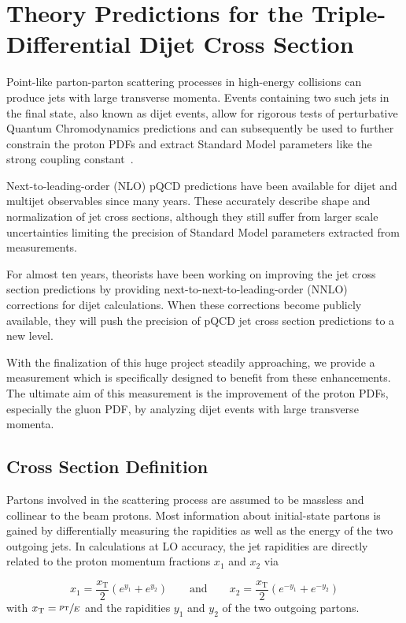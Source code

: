 
\chapter{Theory Predictions for the Triple-Differential Dijet Cross Section}
\label{sec:theory_predictions}

Point-like parton-parton scattering processes in high-energy collisions can
produce jets with large transverse momenta. Events containing two such jets in
the final state, also known as dijet events, allow for rigorous tests of
perturbative Quantum Chromodynamics predictions and can subsequently be used to
further constrain the proton PDFs and extract Standard Model parameters like the
strong coupling constant~\as.

Next-to-leading-order (NLO) pQCD predictions have been available for dijet and
multijet observables since many years. These accurately describe shape and
normalization of jet cross sections, although they still suffer from larger
scale uncertainties limiting the precision of Standard Model parameters
extracted from measurements.

For almost ten years, theorists have been working on improving the jet cross
section predictions by providing next-to-next-to-leading-order (NNLO) corrections for
dijet calculations. When these corrections become publicly available, they will
push the precision of pQCD jet cross section predictions to a new level.

With the finalization of this huge project steadily approaching, we provide a
measurement which is specifically designed to benefit from these enhancements.
The ultimate aim of this measurement is the improvement of the proton PDFs,
especially the gluon PDF, by analyzing dijet events with large transverse momenta.

\section{Cross Section Definition}
\label{sec:crosssection_definition}

Partons involved in the scattering process are assumed to be massless and
collinear to the beam protons. Most information about initial-state partons is
gained by differentially measuring the rapidities as well as the energy of the
two outgoing jets. In calculations at LO accuracy, the jet rapidities are
directly related to the proton momentum fractions $x_1$ and $x_2$ via

\begin{equation*}
    x_1 = \frac{x_\mathrm{T}}{2} \left( e^{y_1} + e^{y_2} \right)
    \qquad\text{and}\qquad x_2 = \frac{x_\mathrm{T}}{2} \left( e^{-y_1} +
    e^{-y_2} \right)
\end{equation*}
with $x_{\mathrm{T}} = \sfrac{p_{\mathrm{T}}}{E}$ and the rapidities $y_1$ and $y_2$ of the two outgoing
partons.

